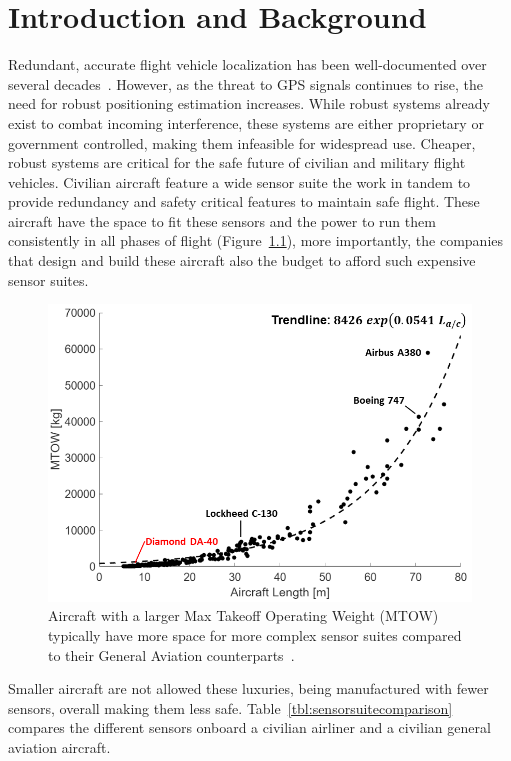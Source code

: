 \documentclass[12pt]{report}
\begin{document}
\normalem{}

\chapter{Introduction and Background}
Redundant, accurate flight vehicle localization has been well-documented over several decades~\cite{zhaoCooperativeLocalizationBased2017,rufaSensorFusionUnmanned2014,tennyRobustNavigationUrban2022,kandemirProbabilisticMeasurementMethod2018}. However, as the threat to GPS signals continues to rise, the need for robust positioning estimation increases. While robust systems already exist to combat incoming interference, these systems are either proprietary or government controlled, making them infeasible for widespread use. Cheaper, robust systems are critical for the safe future of civilian and military flight vehicles. Civilian aircraft feature a wide sensor suite the work in tandem to provide redundancy and safety critical features to maintain safe flight. These aircraft have the space to fit these sensors and the power to run them consistently in all phases of flight (Figure~\ref{fig:weights}), more importantly, the companies that design and build these aircraft also the budget to afford such expensive sensor suites.

\begin{figure}[!ht]\label{fig:weights}
  \centering
  \includegraphics[width=.6\linewidth]{Figures/weights.png}
  \caption{Aircraft with a larger Max Takeoff Operating Weight (MTOW) typically have more space for more complex sensor suites compared to their General Aviation counterparts~\cite{AircraftCharacteristicsDatabase}.}
\end{figure}

Smaller aircraft are not allowed these luxuries, being manufactured with fewer sensors, overall making them less safe. Table~\ref{tbl:sensorsuitecomparison} compares the different sensors onboard a civilian airliner and a civilian general aviation aircraft.
\end{document}

